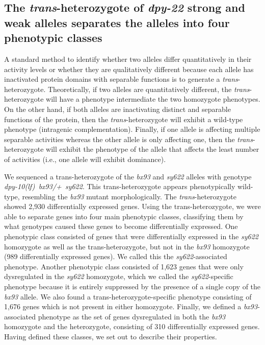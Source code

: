 \documentclass[10pt, onecolumn]{article}
\newcommand{\gene}[1]{\mbox{\emph{#1}}}
\newcommand{\transn}{2,930}
\begin{document}
\subsection*{The \emph{trans}-heterozygote of \gene{dpy-22} strong and weak
             alleles separates the alleles into four phenotypic classes}
A standard method to identify whether two alleles differ quantitatively in their
activity levels or whether they are qualitatively different because each allele
has inactivated protein domains with separable functions is to generate a
\emph{trans}-heterozygote. Theoretically, if two alleles are quantitatively
different, the \emph{trans}-heterozygote will have a phenotype intermediate the
two homozygote phenotypes. On the other hand, if both alleles are inactivating
distinct and separable functions of the protein, then the
\emph{trans}-heterozygote will exhibit a wild-type phenotype
(intragenic complementation). Finally, if one allele is affecting multiple
separable activities whereas the other allele is only affecting one, then the
\emph{trans}-heterozygote will exhibit the phenotype of the allele that affects
the least number of activities (i.e., one allele will exhibit dominance).

We sequenced a trans-heterozygote of the \emph{bx93} and \emph{sy622} alleles
with genotype \gene{dpy-10(lf) bx93/+ sy622}. This trans-heterozygote appears
phenotypically wild-type, resembling the \emph{bx93} mutant morphologically. The
\emph{trans}-heterozygote showed \transn{} differentially expressed genes. Using
the trans-heterozygote, we were able to separate genes into four main phenotypic
classes, classifying them by what genotypes caused these genes to become
differentially expressed. One phenotypic class consisted of genes that were
differentially expressed in the \emph{sy622} homozygote as well as the
trans-heterozygote, but not in the \emph{bx93} homozygote (989 differentially
expressed genes). We called this the \emph{sy622}-associated phenotype. Another
phenotypic class consisted of 1,623 genes that were only dysregulated in the
\emph{sy622} homozygote, which we called the \emph{sy622}-specific phenotype
because it is entirely suppressed by the presence of a single copy of the
\emph{bx93} allele. We also found a trans-heterozygote-specific phenotype
consisting of 1,676 genes which is not present in either homozygote. Finally, we
defined a \emph{bx93}-associated phenotype as the set of genes dysregulated in
both the \emph{bx93} homozygote and the heterozygote, consisting of 310
differentially expressed genes. Having defined these classes, we set out to
describe their properties.
\end{document}
